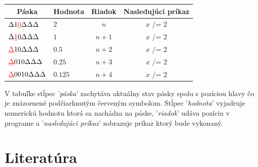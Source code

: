 \documentclass[11pt,a4paper]{article}
\newcommand{\red}[1]{\textcolor{red}{#1}}
\begin{document}
\begin{itemize}
\begin{flushright}
\begin{minipage}{0.90\textwidth}
            \begin{center}
                \begin{tabular}{l|l|c|c}
                    \multicolumn{1}{c|}{\textbf{Páska}} & \multicolumn{1}{c|}{\textbf{Hodnota}} & \multicolumn{1}{c|}{\textbf{Riadok}} & \multicolumn{1}{c}{\textbf{Nasledujúci príkaz}}\\
                    \hline
                    $\Delta 1 \red{\underbar{0}}       \Delta \Delta \Delta$ & $2$     & $n$   & $x \texttt{ /= } 2$\\
                    $\Delta \red{\underbar{1}} 0       \Delta \Delta \Delta$ & $1$     & $n+1$ & $x \texttt{ /= } 2$\\
                    $\red{\underbar{$\Delta$}} 1 0     \Delta \Delta \Delta$ & $0.5$   & $n+2$ & $x \texttt{ /= } 2$\\
                    $\red{\underbar{$\Delta$}} 0 1 0   \Delta \Delta \Delta$ & $0.25$  & $n+3$ & $x \texttt{ /= } 2$\\
                    $\red{\underbar{$\Delta$}} 0 0 1 0 \Delta \Delta \Delta$ & $0.125$ & $n+4$ & $x \texttt{ /= } 2$\\
                \end{tabular}
            \end{center}

            V tabuľke stĺpec '\textit{páska}' zachytáva aktuálny stav pásky spolu s pozíciou hlavy čo je znázornené podčiarknutým červeným symbolom. Stĺpec '\textit{hodnota}' vyjadruje numerickú hodnotu ktorá sa nachádza na páske, '\textit{riadok}' udáva pozíciu v programe a '\textit{nasledujúci príkaz}' zobrazuje príkaz ktorý bude vykonaný.
        \end{minipage}
        \end{flushright}
\end{itemize}

\newpage
\section{Literatúra} %


\begin{flushleft}
    
\end{flushleft}
\end{document}
